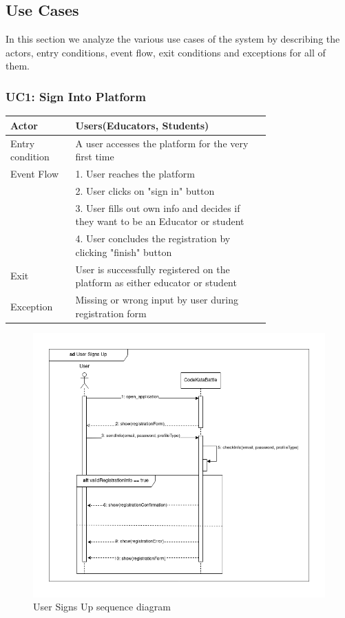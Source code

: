 \subsection{Use Cases}
In this section we analyze the various use cases of the system by describing the actors, entry conditions, event flow, exit conditions and exceptions for all of them.

\newpage
\subsubsection{UC1: Sign Into Platform}
\begin{center}
    \begin{longtable}{lp{0.75\linewidth}}
        \hline
            Actor & Users(Educators, Students)\\
        \hline
            Entry condition & A user accesses the platform for the very first time\\
        \hline
            Event Flow & 1. User reaches the platform\\
                &2. User clicks on "sign in" button\\
                &3. User fills out own info and decides if they want to be an Educator or student\\
                &4. User concludes the registration by clicking "finish" button\\
        \hline
            Exit & User is successfully registered on the platform as either educator or student\\
        \hline
            Exception & Missing or wrong input by user during registration form\\
        \hline
    \end{longtable}
\end{center}


\begin{figure}[H]
    \centering
    \includegraphics[width=1\linewidth]{misc//Images//UC Diagrams/UC1.png}
    \caption{User Signs Up sequence diagram}
    \label{fig:enter-label}
\end{figure}

